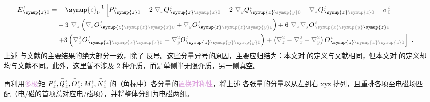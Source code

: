 \begin{subequations}
\begin{align}
	E^{\;\!\mathcolor{gray}{t}}_{\;\! \symup{z}\mathcolor{gray}{0}} = &- {\symup{\varepsilon}}_0^{-1} \left[ P^{\;\!\mathcolor{gray}{t}}_{\;\! \symup{z} \mathcolor{gray}{0}} - 2~ \mathcolor{gray}{\nabla_x} Q^{\;\!\mathcolor{gray}{t}}_{\;\! \symup{z} \mathcolor{gray}{\symup{x}} \mathcolor{gray}{0}} - 2~ \mathcolor{gray}{\nabla_y} Q^{\;\!\mathcolor{gray}{t}}_{\;\! \symup{z} \mathcolor{gray}{\symup{y}} \mathcolor{gray}{0}} - \mathcolor{gray}{\nabla_z} Q^{\;\!\mathcolor{gray}{t}}_{\;\! \symup{z} \mathcolor{gray}{\symup{z}} \mathcolor{gray}{0}} - {\sigma}^{\;\!\mathcolor{gray}{t}}_{\;\! \mathcolor{gray}{0}} \right. \label{eq:E_z0=} \\ & + 3~ \mathcolor{gray}{\nabla_z} \left( \mathcolor{gray}{\nabla_x} O^{\;\!\mathcolor{gray}{t}}_{\;\! \symup{z} \mathcolor{gray}{\symup{z}} \mathcolor{gray}{\symup{x}} \mathcolor{gray}{0}} + \mathcolor{gray}{\nabla_y} O^{\;\!\mathcolor{gray}{t}}_{\;\! \symup{z} \mathcolor{gray}{\symup{z}} \mathcolor{gray}{\symup{y}} \mathcolor{gray}{0}} \right) + 6~ \mathcolor{gray}{\nabla_x} \mathcolor{gray}{\nabla_y} O^{\;\!\mathcolor{gray}{t}}_{\;\! \mathcolor{gray}{\symup{x}} \mathcolor{gray}{\symup{y}} \symup{z} \mathcolor{gray}{0}} \\ & \left. + 3 \left( \mathcolor{gray}{\nabla_x^2} O^{\;\!\mathcolor{gray}{t}}_{\;\! \symup{z} \mathcolor{gray}{\symup{x}} \mathcolor{gray}{\symup{x}} \mathcolor{gray}{0}} + \mathcolor{gray}{\nabla_y^2} O^{\;\!\mathcolor{gray}{t}}_{\;\! \symup{z} \mathcolor{gray}{\symup{y}} \mathcolor{gray}{\symup{y}} \mathcolor{gray}{0}} \right) + \left( \mathcolor{gray}{\nabla_z^2} - \mathcolor{gray}{\nabla_x^2} - \mathcolor{gray}{\nabla_y^2} \right) O^{\;\!\mathcolor{gray}{t}}_{\;\! \symup{z} \mathcolor{gray}{\symup{z}} \mathcolor{gray}{\symup{z}} \mathcolor{gray}{0}} \right] ~.
\end{align}
\end{subequations}
上述  与文献\cite{delangeElectromagneticBoundaryConditions2013}的主要结果的绝大部分一致，除了  反号。这些分量异号的原因，主要应归结为：本文对  的定义与文献\cite{delangeElectromagneticBoundaryConditions2013}相同，但本文对  的定义却均与文献\cite{delangeElectromagneticBoundaryConditions2013}不同。此外，这里暂不涉及 2 种介质，而是单侧半无限介质，另一侧真空。

再利用\textcolor{Plum}{多极}矩 $\bar{P}^{\;\!\mathcolor{gray}{t}}_{\;\!\mathcolor{gray}{z}},\bar{\bar{Q}}^{\;\!\mathcolor{gray}{t}}_{\;\!\mathcolor{gray}{z}},\bar{\bar{\bar{O}}}^{\;\!\mathcolor{gray}{t}}_{\;\!\mathcolor{gray}{z}} ; \bar{M}^{\;\!\mathcolor{gray}{t}}_{\;\!\mathcolor{gray}{z}}, \bar{\bar{N}}^{\;\!\mathcolor{gray}{t}}_{\;\!\mathcolor{gray}{z}}$ 的（角标中）各分量的\textcolor{Plum}{置换对称性}，将上述  各张量的分量以从左到右 xyz 排列，且重排各项至电磁场匹配（电/磁的首项总对应电/磁项），并将整体分组为电磁两组。

